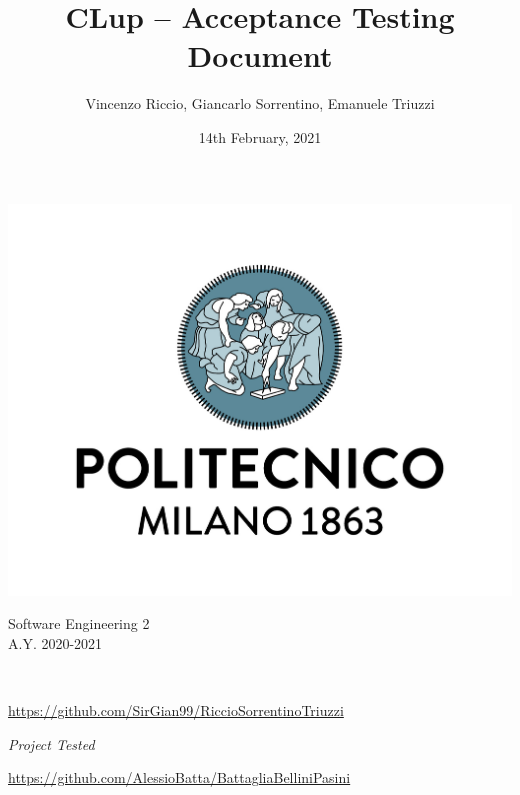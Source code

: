 \documentclass[a4paper,oneside,11pt]{book}
\title{\LARGE{CLup -- Acceptance Testing Document}}
\author{Vincenzo Riccio, Giancarlo Sorrentino, Emanuele Triuzzi}
\date{14th February, 2021}
\begin{document}
\begin{titlingpage} 
    \begin{center}
        \includegraphics[height=0.52\linewidth]{pictures/polimi}\\ %
        \begin{large}
            Software Engineering 2 \\
            A.Y. 2020-2021\\
        \end{large}
        \vspace{4cm} %
        \begin{large} 
            \textbf{\thetitle} \\
        \end{large}
        \vspace{0.7cm}
        \theauthor
        \par\small{\url{https://github.com/SirGian99/RiccioSorrentinoTriuzzi}} \begin{center}
            \par\par \begin{center}\large{\textit{Project Tested}}\end{center} \url{https://github.com/AlessioBatta/BattagliaBelliniPasini}\par\par
        \end{center}
        
        \vspace{6.2cm} %
        \thedate
    \end{center}
\end{titlingpage}
\end{document}
